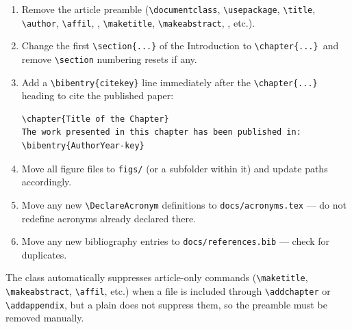 \begin{enumerate}
  \item Remove the article preamble (\verb|\documentclass|, \verb|\usepackage|, \verb|\title|, \verb|\author|, \verb|\affil|, \verb||, \verb|\maketitle|, \verb|\makeabstract|, \verb||, etc.).
  \item Change the first \verb|\section{...}| of the Introduction to \verb|\chapter{...}|\ and remove \verb|\section| numbering resets if any.
  \item Add a \verb|\bibentry{citekey}| line immediately after the \verb|\chapter{...}| heading to cite the published paper:
\begin{verbatim}
\chapter{Title of the Chapter}
The work presented in this chapter has been published in:
\bibentry{AuthorYear-key}
\end{verbatim}
  \item Move all figure files to \texttt{figs/} (or a subfolder within it) and update paths accordingly.
  \item Move any new \verb|\DeclareAcronym| definitions to \texttt{docs/acronyms.tex} — do not redefine acronyms already declared there.
  \item Move any new bibliography entries to \texttt{docs/references.bib} — check for duplicates.
\end{enumerate}

The class automatically suppresses article-only commands (\verb|\maketitle|, \verb|\makeabstract|, \verb|\affil|, etc.) when a file is included through \verb|\addchapter| or \verb|\addappendix|, but a plain \verb|| does not suppress them, so the preamble must be removed manually.


